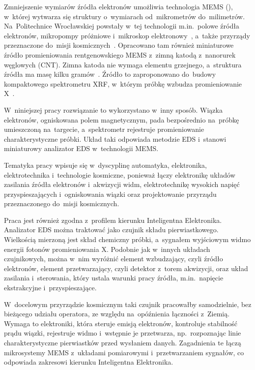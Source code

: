 Zmniejszenie wymiarów źródła elektronów umożliwia technologia MEMS
(), w~której wytwarza się
struktury o~wymiarach od~mikrometrów do~milimetrów. Na~Politechnice
Wrocławskiej powstały w~tej technologii m.in.\ polowe źródła elektronów,
mikropompy próżniowe i~mikroskop elektronowy~\cite{krysztof2019imaging},
a~także przyrządy przeznaczone do~misji kosmicznych~\cite{dziuban2022methane}.
Opracowano tam również miniaturowe źródło promieniowania rentgenowskiego
MEMS z~zimną katodą z~nanorurek węglowych (CNT).
Zimna katoda nie wymaga elementu grzejnego, a~struktura źródła ma masę
kilku gramów~\cite{urbanski2026phd}. Źródło to zaproponowano do~budowy
kompaktowego spektrometru XRF, w~którym próbkę wzbudza promieniowanie
X~\cite{urbanski2026xrf}.

W~niniejszej pracy rozwiązanie to wykorzystano w~inny sposób. Wiązka
elektronów, ogniskowana polem magnetycznym, pada bezpośrednio na~próbkę
umieszczoną na~targecie, a~spektrometr rejestruje promieniowanie
charakterystyczne próbki. Układ taki odpowiada metodzie EDS i~stanowi
miniaturowy analizator EDS w~technologii MEMS.

Tematyka pracy wpisuje się w~dyscyplinę automatyka, elektronika,
elektrotechnika i~technologie kosmiczne, ponieważ łączy elektronikę
układów zasilania źródła elektronów i~akwizycji widm, elektrotechnikę
wysokich napięć przyspieszających i~ogniskowania wiązki oraz
projektowanie przyrządu przeznaczonego do~misji kosmicznych.

Praca jest również zgodna z~profilem kierunku Inteligentna Elektronika.
Analizator EDS można traktować jako czujnik składu pierwiastkowego.
Wielkością mierzoną jest skład chemiczny próbki, a~sygnałem wyjściowym
widmo energii fotonów promieniowania X. Podobnie jak w~innych układach
czujnikowych, można w~nim wyróżnić element wzbudzający, czyli źródło
elektronów, element przetwarzający, czyli detektor z~torem akwizycji,
oraz układ zasilania i~sterowania, który ustala warunki pracy źródła,
m.in.\ napięcie ekstrakcyjne i~przyspieszające.

W~docelowym przyrządzie kosmicznym taki czujnik pracowałby samodzielnie,
bez bieżącego udziału operatora, ze względu na~opóźnienia łączności
z~Ziemią. Wymaga to elektroniki, która steruje emisją elektronów,
kontroluje stabilność prądu wiązki, rejestruje widmo i~wstępnie je
przetwarza, np.~rozpoznając linie charakterystyczne pierwiastków przed
wysłaniem danych. Zagadnienia te łączą mikrosystemy MEMS z~układami
pomiarowymi i~przetwarzaniem sygnałów, co odpowiada zakresowi kierunku
Inteligentna Elektronika.

